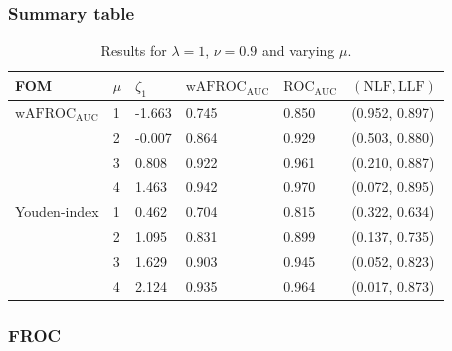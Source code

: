 \documentclass[
]{book}
\begin{document}
\hypertarget{summary-table-3}{%
\subsubsection{Summary table}\label{summary-table-3}}

\begin{table}

\caption{\label{tab:optim-op-point-table-vary-mu}Results for $\lambda = 1$, $\nu = 0.9$ and varying $\mu$.}
\centering
\fontsize{10}{12}\selectfont
\begin{tabular}[t]{llllll}
\toprule
FOM & $\mu$ & $\zeta_1$ & $\text{wAFROC}_\text{AUC}$ & $\text{ROC}_\text{AUC}$ & $\left( \text{NLF}, \text{LLF}\right)$\\
\midrule
$\text{wAFROC}_\text{AUC}$ & 1 & -1.663 & 0.745 & 0.850 & (0.952, 0.897)\\
 & 2 & -0.007 & 0.864 & 0.929 & (0.503, 0.880)\\
 & 3 & 0.808 & 0.922 & 0.961 & (0.210, 0.887)\\
 & 4 & 1.463 & 0.942 & 0.970 & (0.072, 0.895)\\
Youden-index & 1 & 0.462 & 0.704 & 0.815 & (0.322, 0.634)\\
\addlinespace
 & 2 & 1.095 & 0.831 & 0.899 & (0.137, 0.735)\\
 & 3 & 1.629 & 0.903 & 0.945 & (0.052, 0.823)\\
 & 4 & 2.124 & 0.935 & 0.964 & (0.017, 0.873)\\
\bottomrule
\end{tabular}
\end{table}

\hypertarget{froc-4}{%
\subsubsection{FROC}\label{froc-4}}
\end{document}
